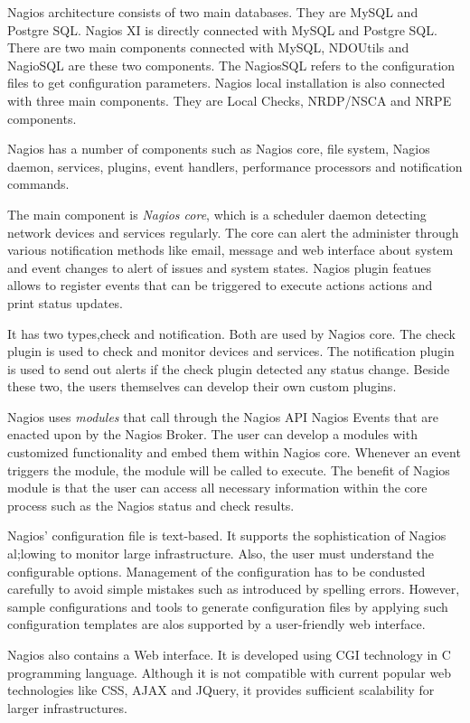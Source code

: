 \documentclass[9pt,twocolumn,twoside]{styles/osajnl}
\begin{document}
Nagios architecture consists of two main databases. They are MySQL and
Postgre SQL.  Nagios XI is directly connected with MySQL and Postgre
SQL. There are two main components connected with MySQL, NDOUtils and
NagioSQL are these two components. The NagiosSQL refers to the
configuration files to get configuration parameters. Nagios local
installation is also connected with three main components. They are
Local Checks, NRDP/NSCA and NRPE components.

Nagios has a number of components such as Nagios core, file system,
Nagios daemon, services, plugins, event handlers, performance processors
and notification commands.

The main component is {\em Nagios core}, which is a scheduler daemon
detecting network devices and services regularly. The core can alert
the administer through various notification methods like email,
message and web interface about system and event changes to alert of
issues and system states. Nagios plugin featues allows to register
events that can be triggered to execute actions actions and print
status updates.

It has two types,check and notification. Both are used by Nagios
core. The check plugin is used to check and monitor devices and
services. The notification plugin is used to send out alerts if the
check plugin detected any status change. Beside these two, the users
themselves can develop their own custom plugins.

Nagios uses {\em modules} that call through the Nagios API Nagios
Events that are enacted upon by the Nagios Broker. The user can
develop a modules with customized functionality and embed them within
Nagios core. Whenever an event triggers the module, the module
will be called to execute. The benefit of Nagios module is that the
user can access all necessary information within the core process such
as the Nagios status and check results.

Nagios' configuration file is text-based. It supports the
sophistication of Nagios al;lowing to monitor large
infrastructure. Also, the user must understand the configurable
options. Management of the configuration has to be condusted carefully
to avoid simple mistakes such as introduced by spelling
errors. However, sample configurations and tools to generate
configuration files by applying such configuration templates are alos
supported by a user-friendly web interface.

Nagios also contains a Web interface. It is developed using
CGI technology in C programming language. Although it is not 
compatible with current popular web technologies like CSS, AJAX
and JQuery, it provides sufficient scalability for larger infrastructures.
\end{document}
